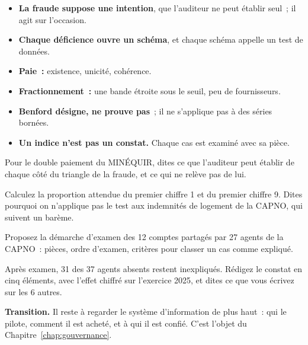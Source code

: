 \begin{boxresume}
\begin{itemize}
    \item \textbf{La fraude suppose une intention}, que l'auditeur ne peut
          établir seul~; il agit sur l'occasion.
    \item \textbf{Chaque déficience ouvre un schéma}, et chaque schéma
          appelle un test de données.
    \item \textbf{Paie~:} existence, unicité, cohérence.
    \item \textbf{Fractionnement~:} une bande étroite sous le seuil, peu de
          fournisseurs.
    \item \textbf{Benford désigne, ne prouve pas}~; il ne s'applique pas à
          des séries bornées.
    \item \textbf{Un indice n'est pas un constat.} Chaque cas est examiné
          avec sa pièce.
\end{itemize}
\end{boxresume}

\begin{boxexo}[title={\ding{45}\quad Exercice~12.1. Le triangle \niveaubase}]
Pour le double paiement du MINÉQUIR, dites ce que l'auditeur peut
établir de chaque côté du triangle de la fraude, et ce qui ne relève pas
de lui.
\end{boxexo}

\begin{boxexo}[title={\ding{45}\quad Exercice~12.2. Benford \niveaubase}]
Calculez la proportion attendue du premier chiffre 1 et du premier
chiffre 9. Dites pourquoi on n'applique pas le test aux indemnités de
logement de la CAPNO, qui suivent un barème.
\end{boxexo}

\begin{boxexo}[title={\ding{45}\quad Exercice~12.3. Les comptes partagés \niveaumoyen}]
Proposez la démarche d'examen des 12 comptes partagés par 27 agents de la
CAPNO~: pièces, ordre d'examen, critères pour classer un cas comme
expliqué.
\end{boxexo}

\begin{boxexo}[title={\ding{45}\quad Exercice~12.4. Du tableur au rapport \niveauexpert}]
Après examen, 31 des 37 agents absents restent inexpliqués. Rédigez le
constat en cinq éléments, avec l'effet chiffré sur l'exercice 2025, et
dites ce que vous écrivez sur les 6 autres.
\end{boxexo}

\begin{boxinfo}
\textbf{Transition.} Il reste à regarder le système d'information de
plus haut~: qui le pilote, comment il est acheté, et à qui il est confié.
C'est l'objet du Chapitre~\ref{chap:gouvernance}.
\end{boxinfo}
